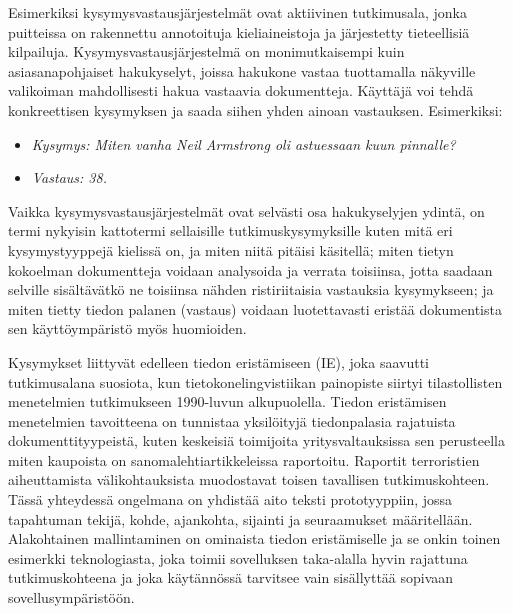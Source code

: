 \documentclass{../../metanetpaper}
\begin{document}
\begin{Parallel}[c]{79mm}{78mm}
{Esimerkiksi kysymysvastausjärjestelmät ovat aktiivinen tutkimusala,
jonka puitteissa on rakennettu annotoituja kieliaineistoja ja
järjestetty tieteellisiä kilpailuja. Kysymysvastausjärjestelmä on monimutkaisempi 
kuin asiasanapohjaiset hakukyselyt, joissa hakukone vastaa
tuottamalla näkyville valikoiman mahdollisesti hakua vastaavia
dokumentteja. Käyttäjä voi tehdä konkreettisen kysymyksen ja saada siihen 
yhden ainoan vastauksen. Esimerkiksi:
\begin{itemize}
\item[] \textit{Kysymys: Miten vanha Neil Armstrong oli astuessaan
 kuun pinnalle?}

\item[] \textit{Vastaus: 38.}
\end{itemize}

Vaikka kysymysvastausjärjestelmät ovat selvästi osa hakukyselyjen
ydintä, on termi nykyisin kattotermi sellaisille tutkimuskysymyksille
kuten mitä eri kysymystyyppejä kielissä on, ja miten niitä pitäisi
käsitellä; miten tietyn kokoelman dokumentteja voidaan analysoida ja
verrata toisiinsa, jotta saadaan selville sisältävätkö ne toisiinsa
nähden ristiriitaisia vastauksia kysymykseen; ja miten tietty tiedon
palanen (vastaus) voidaan luotettavasti eristää dokumentista sen
käyttöympäristö myös huomioiden.

Kysymykset liittyvät edelleen tiedon eristämiseen (IE), joka saavutti
tutkimusalana suosiota, kun tietokonelingvistiikan painopiste siirtyi
tilastollisten menetelmien tutkimukseen 1990-luvun
alkupuolella. Tiedon eristämisen menetelmien tavoitteena on tunnistaa
yksilöityjä tiedonpalasia rajatuista dokumenttityypeistä, kuten
keskeisiä toimijoita yritysvaltauksissa sen perusteella miten
kaupoista on sanomalehtiartikkeleissa raportoitu.  Raportit
terroristien aiheuttamista välikohtauksista muodostavat toisen
tavallisen tutkimuskohteen. Tässä yhteydessä ongelmana on yhdistää
aito teksti prototyyppiin, jossa tapahtuman tekijä, kohde, ajankohta,
sijainti ja seuraamukset määritellään. Alakohtainen mallintaminen on
ominaista tiedon eristämiselle ja se onkin toinen esimerkki
teknologiasta, joka toimii sovelluksen taka-alalla hyvin rajattuna
tutkimuskohteena ja joka käytännössä tarvitsee vain sisällyttää
sopivaan sovellusympäristöön.


}
\end{Parallel}
\end{document}

